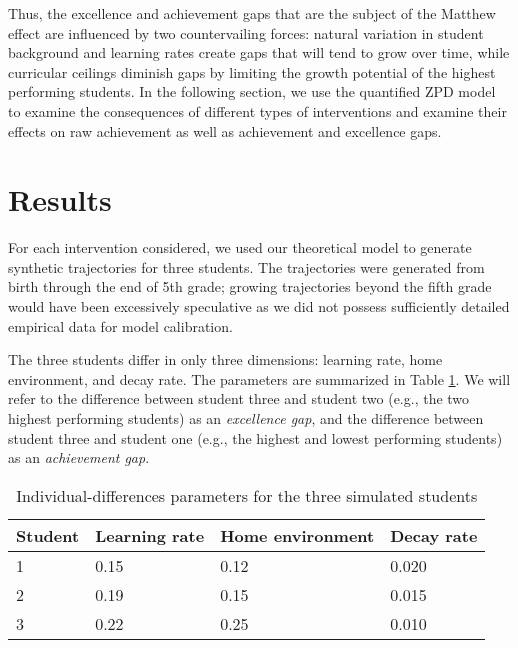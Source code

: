 \documentclass[english,floatsintext,jou]{apa6}
\theoremstyle{definition}
\theoremstyle{definition}
\theoremstyle{definition}
\theoremstyle{remark}
\begin{document}
Thus, the excellence and achievement gaps that are the subject of the
Matthew effect are influenced by two countervailing forces: natural
variation in student background and learning rates create gaps that will
tend to grow over time, while curricular ceilings diminish gaps by
limiting the growth potential of the highest performing students. In the
following section, we use the quantified ZPD model to examine the
consequences of different types of interventions and examine their
effects on raw achievement as well as achievement and excellence gaps.

\section{Results}\label{results}

For each intervention considered, we used our theoretical model to
generate synthetic trajectories for three students. The trajectories
were generated from birth through the end of 5th grade; growing
trajectories beyond the fifth grade would have been excessively
speculative as we did not possess sufficiently detailed empirical data
for model calibration.

The three students differ in only three dimensions: learning rate, home
environment, and decay rate. The parameters are summarized in Table
\ref{tab:parameters}. We will refer to the difference between student
three and student two (e.g., the two highest performing students) as an
\emph{excellence gap}, and the difference between student three and
student one (e.g., the highest and lowest performing students) as an
\emph{achievement gap}.

\begin{table}[tbp]
\begin{center}
\begin{threeparttable}
\caption{\label{tab:parameters}Individual-differences parameters for the three simulated students}
\small{
\begin{tabular}{llll}
\toprule
Student & Learning rate & Home environment & Decay rate\\
\midrule
1 & 0.15 & 0.12 & 0.020\\
2 & 0.19 & 0.15 & 0.015\\
3 & 0.22 & 0.25 & 0.010\\
\bottomrule
\end{tabular}
}
\end{threeparttable}
\end{center}
\end{table}
\end{document}
